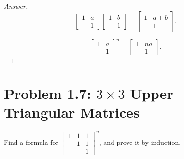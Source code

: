 \documentclass{amsbook}
\theoremstyle{definition}
\theoremstyle{remark}
\numberwithin{section}{chapter}
\numberwithin{equation}{chapter}
\begin{document}
\begin{proof}[Answer]
\[
\begin{bmatrix}
1 &a\\
   &1\end{bmatrix}\begin{bmatrix}
1 &b\\
   &1\end{bmatrix}=\begin{bmatrix}
1 &a+b\\
   &1\end{bmatrix}.
\]

\[
\begin{bmatrix}
1 &a\\
   &1\end{bmatrix}^n=\begin{bmatrix}
1 &na\\
   &1\end{bmatrix}.
\]
\end{proof}

\section{Problem 1.7: $3\times3$ Upper Triangular Matrices}
Find a formula for $\begin{bmatrix}
1&1&1\\
  &1&1\\
  &  &1\end{bmatrix}^n$, and prove it by induction.
\end{document}
